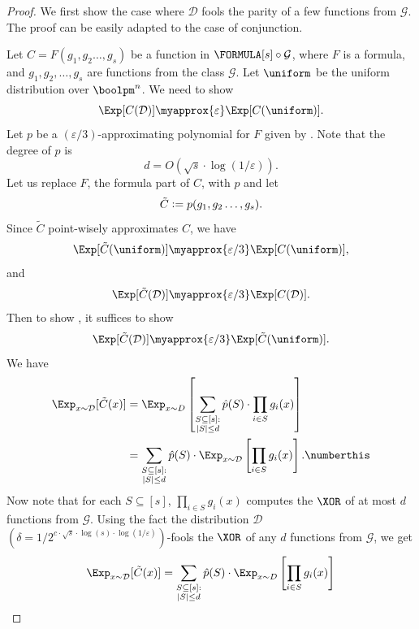 	\begin{proof}\renewcommand{\qedsymbol}{$\square$ (\Cref{thm:prg-main})}
    	We first show the case where $\mathcal{D}$ fools the parity of a few functions from $\mathcal{G}$. The proof can be easily adapted to the case of conjunction.
    	
    	Let $C=F(g_1,g_2\dots,g_s)$ be a function in $\FORMULA[s]\circ\mathcal{G}$, where $F$ is a formula, and $g_1,g_2,\dots,g_s$ are functions from the class $\mathcal{G}$. Let $\uniform$ be the uniform distribution over $\boolpm^n$. 
    	We need to show
    	\begin{equation}\label{eq:prg-1}
    		\Exp[C(\mathcal{D})] \myapprox{\varepsilon} \Exp[C(\uniform)].
    	\end{equation}
    	Let $p$ be a $(\varepsilon/3)$-approximating polynomial for $F$ given by . Note that the degree of $p$ is
    	\[
    		d=O(\sqrt{s}\cdot\log(1/\varepsilon)).
    	\] 
    	Let us replace $F$, the formula part of $C$, with $p$ and let
    	\[
    		\tilde{C}\vcentcolon=p(g_1,g_2\dots,g_s).
    	\]
    	Since $\tilde{C}$ point-wisely approximates $C$, we have
    	\[
    		\Exp[\tilde{C}(\uniform)] \myapprox{\varepsilon/3} \Exp[C(\uniform)],
    	\]
    	and
    	\[
    		\Exp[\tilde{C}(\mathcal{D})] \myapprox{\varepsilon/3} \Exp[C(\mathcal{D})].
    	\]
    	Then to show , it suffices to show
    	\[
    		\Exp[\tilde{C}(\mathcal{D})] \myapprox{\varepsilon/3} \Exp[\tilde{C}(\uniform)].
    	\]
    	We have
    	\begin{align*}
        	\label{eq:prg-2}
        	\Exp_{x\sim \mathcal{D}}[\tilde{C}(x)]&=\Exp_{x\sim D}\left[\sum_{\substack{S\subseteq[s]: \\ |S|\leq d}}\hat{p}(S)\cdot\prod_{i\in S}g_i(x)\right]\\
        	&=\sum_{\substack{S\subseteq[s]: \\ |S|\leq d}}\hat{p}(S)\cdot\Exp_{x\sim \mathcal{D}}\left[\prod_{i\in S}g_i(x)\right].
        	\numberthis
    	\end{align*}
    	Now note that for each $S\subseteq[s]$, $\prod_{i\in S}g_i(x)$ computes the $\XOR$ of at most $d$ functions from $\mathcal{G}$.
    	Using the fact the distribution $\mathcal{D}$ $\left(\delta=1/2^{c\cdot\sqrt{s}\cdot\log (s)\cdot \log(1/\varepsilon)}\right)$-fools the $\XOR$ of any $d$ functions from $\mathcal{G}$, we get
    	\begin{align*}
        	\Exp_{x\sim \mathcal{D}}[\tilde{C}(x)]&=\sum_{\substack{S\subseteq[s]: \\ |S|\leq d}}\hat{p}(S)\cdot\Exp_{x\sim D}\left[\prod_{i\in S}g_i(x)\right]\\

\end{align*}
\end{proof}
